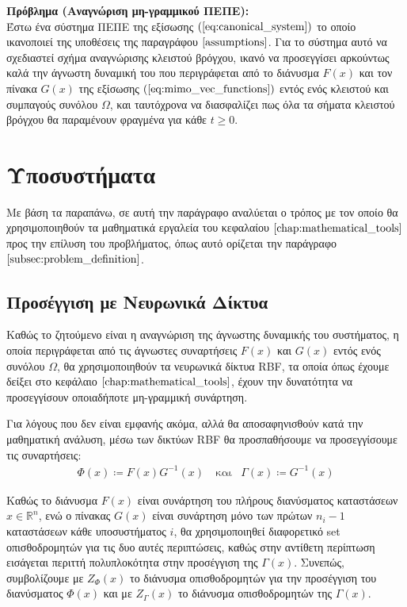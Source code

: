 \textbf{Πρόβλημα (Αναγνώριση μη-γραμμικού ΠΕΠΕ):}\\
Έστω ένα σύστημα ΠΕΠΕ της εξίσωσης $(\ref{eq:canonical_system})$ το οποίο ικανοποιεί της υποθέσεις της παραγράφου $\ref{assumptions}$. Για το σύστημα αυτό να σχεδιαστεί σχήμα αναγνώρισης κλειστού βρόγχου, ικανό να προσεγγίσει αρκούντως καλά την άγνωστη δυναμική του που περιγράφεται από το διάνυσμα $F(x)$ και τον πίνακα $G(x)$ της εξίσωσης $(\ref{eq:mimo_vec_functions})$ εντός ενός κλειστού και συμπαγούς συνόλου $\Omega$, και ταυτόχρονα να διασφαλίζει πως όλα τα σήματα κλειστού βρόγχου θα παραμένουν φραγμένα για κάθε $t \geq 0$.

\section{Υποσυστήματα}
Με βάση τα παραπάνω, σε αυτή την παράγραφο αναλύεται ο τρόπος με τον οποίο θα χρησιμοποιηθούν τα μαθηματικά εργαλεία του κεφαλαίου $\ref{chap:mathematical_tools}$ προς την επίλυση του προβλήματος, όπως αυτό ορίζεται την παράγραφο $\ref{subsec:problem_definition}$.

\subsection{Προσέγγιση με Νευρωνικά Δίκτυα}
Καθώς το ζητούμενο είναι η αναγνώριση της άγνωστης δυναμικής του συστήματος, η οποία περιγράφεται από τις άγνωστες συναρτήσεις $F(x)$ και $G(x)$ εντός ενός συνόλου $\Omega$, θα χρησιμοποιηθούν τα νευρωνικά δίκτυα RBF, τα οποία όπως έχουμε δείξει στο κεφάλαιο $\ref{chap:mathematical_tools}$, έχουν την δυνατότητα να προσεγγίσουν οποιαδήποτε μη-γραμμική συνάρτηση.

Για λόγους που δεν είναι εμφανής ακόμα, αλλά θα αποσαφηνισθούν κατά την μαθηματική ανάλυση, μέσω των δικτύων RBF θα προσπαθήσουμε να προσεγγίσουμε τις συναρτήσεις:
\begin{equation}
	\begin{matrix}
	\varPhi(x) \coloneqq F(x)G^{-1}(x) & \: \text{και} &
	\Gamma(x) \coloneqq G^{-1}(x)
	\end{matrix}
	\label{eq:approximate_functions}
\end{equation}

Καθώς το διάνυσμα $F(x)$ είναι συνάρτηση του πλήρους διανύσματος καταστάσεων $x \in \mathbb{R}^n$, ενώ ο πίνακας $G(x)$ είναι συνάρτηση μόνο των πρώτων $n_i - 1$ καταστάσεων κάθε υποσυστήματος $i$, θα χρησιμοποιηθεί διαφορετικό set οπισθοδρομητών για τις δυο αυτές περιπτώσεις, καθώς στην αντίθετη περίπτωση εισάγεται περιττή πολυπλοκότητα στην προσέγγιση της $\Gamma(x)$. Συνεπώς, συμβολίζουμε με $Z_{\varPhi}(x)$ το διάνυσμα οπισθοδρομητών για την προσέγγιση του διανύσματος $\varPhi(x)$ και με $Z_{\Gamma}(x)$ το διάνυσμα οπισθοδρομητών της $\Gamma(x)$.

